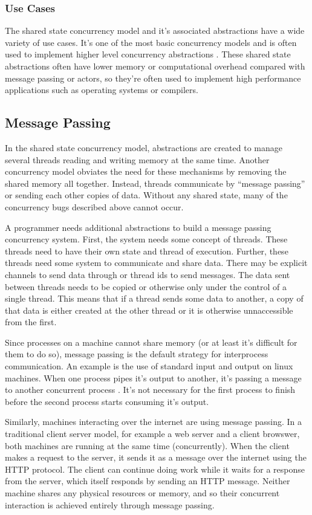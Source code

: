 \documentclass{article}
\begin{document}
\subsubsection{Use Cases}
The shared state concurrency model and it's associated abstractions have a wide
variety of use cases. It's one of the most basic concurrency models and is often
used to implement higher level concurrency abstractions \cite{TuftsCS21,
  Coursera}. These shared state abstractions often have lower memory or
computational overhead compared with message passing or actors, so they're often
used to implement high performance applications such as operating systems or
compilers.


\subsection{Message Passing}
In the shared state concurrency model, abstractions are created
to manage several threads reading and writing memory at the same
time. Another concurrency model obviates the need for these
mechanisms by removing the shared memory all together. Instead,
threads communicate by ``message passing'' or sending each other
copies of data. Without any shared state, many of the concurrency
bugs described above cannot occur.
\cite{Coursera, TuftsCS21}

A programmer needs additional abstractions to build a message
passing concurrency system. First, the system needs some concept
of threads. These threads need to have their own state and thread
of execution. Further, these threads need some system to communicate
and share data. There may be explicit channels to send data through
or thread ids to send messages. The data sent between threads needs
to be copied or otherwise only under the control of a single thread.
This means that if a thread sends some data to another, a copy of
that data is either created at the other thread or it is otherwise
unnaccessible from the first.
\cite{Coursera, TuftsCS21}

Since processes on a machine cannot share memory (or at least it's difficult for
them to do so), message passing is the default strategy for interprocess
communication. An example is the use of standard input and output on linux
machines. When one process pipes it's output to another, it's passing a message
to another concurrent process \cite{MIT6031}. It's not necessary for the first
process to finish before the second process starts consuming it's output.

Similarly, machines interacting over the internet are using message
passing. In a traditional client server model, for example a web
server and a client browswer, both machines are running at the same
time (concurrently). When the client makes a request to the server,
it sends it as a message over the internet using the HTTP protocol.
The client can continue doing work while it waits for a response
from the server, which itself responds by sending an HTTP message.
Neither machine shares any physical resources or memory, and so
their concurrent interaction is achieved entirely through message
passing.
\cite{MIT6031, TuftsCS21}
\end{document}
